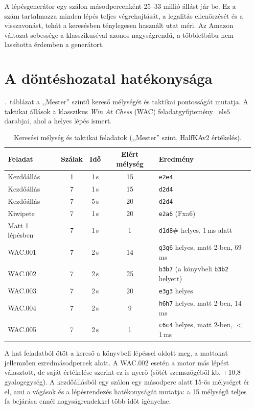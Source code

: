 A lépésgenerátor egy szálon másodpercenként 25--33 millió állást jár be. Ez a szám tartalmazza minden lépés teljes végrehajtását, a legalitás ellenőrzését és a visszavonást, tehát a keresésben ténylegesen használt utat méri. Az Amazon változat sebessége a klasszikuséval azonos nagyságrendű, a többletbábu nem lassította érdemben a generátort.

\section{A döntéshozatal hatékonysága}

.~táblázat a ,,Mester'' szintű kereső mélységét és taktikai pontosságát mutatja. A taktikai állások a klasszikus \emph{Win At Chess} (WAC) feladatgyűjtemény~\cite{Reinfeld58} első darabjai, ahol a helyes lépés ismert.

\begin{table}[!ht]
	\footnotesize
	\centering
	\begin{tabular}{l c c c l}
		\toprule
		Feladat & Szálak & Idő & Elért mélység & Eredmény \\
		\midrule
		Kezdőállás & 1 & 1\,s & 15 & \texttt{e2e4} \\
		Kezdőállás & 7 & 1\,s & 15 & \texttt{d2d4} \\
		Kezdőállás & 7 & 5\,s & 20 & \texttt{d2d4} \\
		Kiwipete & 7 & 1\,s & 20 & \texttt{e2a6} (Fxa6) \\
		Matt 1 lépésben & 7 & 1\,s & 1 & \texttt{d1d8}\# helyes, 1\,ms alatt \\
		WAC.001 & 7 & 2\,s & 14 & \texttt{g3g6} helyes, matt 2-ben, 69\,ms \\
		WAC.002 & 7 & 2\,s & 25 & \texttt{b3b7} (a könyvbeli \texttt{b3b2} helyett) \\
		WAC.003 & 7 & 2\,s & 20 & \texttt{e3g3} helyes \\
		WAC.004 & 7 & 2\,s & 9 & \texttt{h6h7} helyes, matt 2-ben, 14\,ms \\
		WAC.005 & 7 & 2\,s & 1 & \texttt{c6c4} helyes, matt 2-ben, $<$1\,ms \\
		\bottomrule
	\end{tabular}
	\caption{Keresési mélység és taktikai feladatok (,,Mester'' szint, HalfKAv2 értékelés).}
	\label{tab:search}
\end{table}

A hat feladatból ötöt a kereső a könyvbeli lépéssel oldott meg, a mattokat jellemzően ezredmásodpercek alatt. A WAC.002 esetén a motor más lépést választott, de saját értékelése szerint ez is nyerő (sötét szemszögéből kb. +10,8 gyalogegység). A kezdőállásból egy szálon egy másodperc alatt 15-ös mélységet ér el, ami a vágások és a lépésrendezés hatékonyságát mutatja: a 15 mélységű teljes fa bejárása ennél nagyságrendekkel több időt igényelne.


